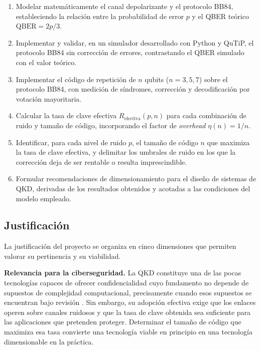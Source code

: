 \documentclass[12pt]{report}
\begin{document}
\begin{enumerate}
    \item Modelar matemáticamente el canal depolarizante y el protocolo BB84,
    estableciendo la relación entre la probabilidad de error $p$ y el QBER
    teórico $\mathrm{QBER} = 2p/3$.
    \item Implementar y validar, en un simulador desarrollado con Python y QuTiP,
    el protocolo BB84 sin corrección de errores, contrastando el QBER simulado con
    el valor teórico.
    \item Implementar el código de repetición de $n$ qubits ($n = 3, 5, 7$) sobre
    el protocolo BB84, con medición de síndromes, corrección y decodificación por
    votación mayoritaria.
    \item Calcular la tasa de clave efectiva $R_{\text{efectiva}}(p,n)$ para cada
    combinación de ruido y tamaño de código, incorporando el factor de
    \textit{overhead} $\eta(n) = 1/n$.
    \item Identificar, para cada nivel de ruido $p$, el tamaño de código $n$ que
    maximiza la tasa de clave efectiva, y delimitar los umbrales de ruido en los
    que la corrección deja de ser rentable o resulta imprescindible.
    \item Formular recomendaciones de dimensionamiento para el diseño de sistemas
    de QKD, derivadas de los resultados obtenidos y acotadas a las condiciones del
    modelo empleado.
\end{enumerate}

\subsection{Justificación}

La justificación del proyecto se organiza en cinco dimensiones que permiten
valorar su pertinencia y su viabilidad.

\textbf{Relevancia para la ciberseguridad.} La QKD constituye una de las pocas
tecnologías capaces de ofrecer confidencialidad cuyo fundamento no depende de
supuestos de complejidad computacional, precisamente cuando esos supuestos se
encuentran bajo revisión \citep{mosca2018, nist2026ir}. Sin embargo, su adopción
efectiva exige que los enlaces operen sobre canales ruidosos y que la tasa de
clave obtenida sea suficiente para las aplicaciones que pretenden proteger.
Determinar el tamaño de código que maximiza esa tasa convierte una tecnología
viable en principio en una tecnología dimensionable en la práctica.
\end{document}
